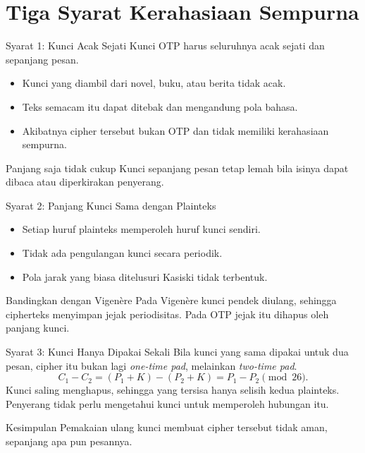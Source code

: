 \documentclass[aspectratio=169,11pt]{beamer}
\begin{document}
\section{Tiga Syarat Kerahasiaan Sempurna}

\begin{frame}{Syarat 1: Kunci Acak Sejati}
    \footnotesize
    Kunci OTP harus seluruhnya acak sejati dan sepanjang pesan.
    \begin{itemize}
        \item Kunci yang diambil dari novel, buku, atau berita tidak acak.
        \item Teks semacam itu dapat ditebak dan mengandung pola bahasa.
        \item Akibatnya cipher tersebut bukan OTP dan tidak memiliki
              kerahasiaan sempurna.
    \end{itemize}
    \vspace{0.2cm}
    \begin{alertblock}{Panjang saja tidak cukup}
        Kunci sepanjang pesan tetap lemah bila isinya dapat dibaca atau
        diperkirakan penyerang.
    \end{alertblock}
\end{frame}

\begin{frame}{Syarat 2: Panjang Kunci Sama dengan Plainteks}
    \footnotesize
    \begin{itemize}
        \item Setiap huruf plainteks memperoleh huruf kunci sendiri.
        \item Tidak ada pengulangan kunci secara periodik.
        \item Pola jarak yang biasa ditelusuri Kasiski tidak terbentuk.
    \end{itemize}
    \vspace{0.2cm}
    \begin{exampleblock}{Bandingkan dengan Vigen\`ere}
        Pada Vigen\`ere kunci pendek diulang, sehingga cipherteks menyimpan
        jejak periodisitas. Pada OTP jejak itu dihapus oleh panjang kunci.
    \end{exampleblock}
\end{frame}

\begin{frame}{Syarat 3: Kunci Hanya Dipakai Sekali}
    \footnotesize
    Bila kunci yang sama dipakai untuk dua pesan, cipher itu bukan lagi
    \emph{one-time pad}, melainkan \emph{two-time pad}.
    \[
        C_1 - C_2 = (P_1 + K) - (P_2 + K) = P_1 - P_2 \pmod{26}.
    \]
    Kunci saling menghapus, sehingga yang tersisa hanya selisih kedua
    plainteks. Penyerang tidak perlu mengetahui kunci untuk memperoleh
    hubungan itu.
    \vspace{0.1cm}
    \begin{alertblock}{Kesimpulan}
        Pemakaian ulang kunci membuat cipher tersebut tidak aman, sepanjang
        apa pun pesannya.
    \end{alertblock}
\end{frame}
\end{document}
